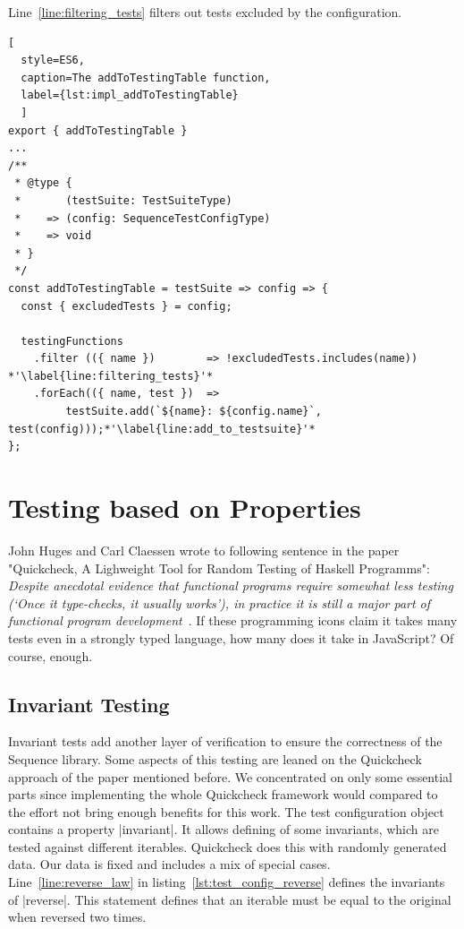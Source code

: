 Line~\ref{line:filtering_tests} filters out tests excluded by the
configuration. 
\begin{lstlisting}[
  style=ES6, 
  caption=The addToTestingTable function,
  label={lst:impl_addToTestingTable}
  ]
export { addToTestingTable }
...
/**
 * @type {
 *       (testSuite: TestSuiteType)
 *    => (config: SequenceTestConfigType)
 *    => void
 * }
 */
const addToTestingTable = testSuite => config => {
  const { excludedTests } = config;

  testingFunctions
    .filter (({ name })        => !excludedTests.includes(name)) *'\label{line:filtering_tests}'*
    .forEach(({ name, test })  => 
         testSuite.add(`${name}: ${config.name}`, test(config)));*'\label{line:add_to_testsuite}'*
};
\end{lstlisting}


\section{Testing based on Properties}
\label{sec:Testing based on Properties}
John Huges and Carl Claessen wrote to following sentence in the paper
"Quickcheck, A Lighweight Tool for Random Testing of Haskell Programms":
\textit{
Despite anecdotal evidence that functional programs require somewhat less
testing (`Once it type-checks, it usually works'), in practice it is still a 
major part of functional program development}~\cite{quickcheck_hughes}.
If these programming icons claim it takes many tests even in a strongly typed 
language, how many does it take in JavaScript? Of course, enough.

\subsection{Invariant Testing}
\label{sub:Invariant Testing}
Invariant tests add another layer of verification to ensure the correctness of
the Sequence library. Some aspects of this testing are leaned on the Quickcheck
approach of the paper mentioned before. We concentrated on only some essential
parts since implementing the whole Quickcheck framework would compared to the
effort not bring enough benefits for this work.
\newline
The test configuration object contains a property |invariant|. It allows
defining of some invariants, which are tested against different iterables.
Quickcheck does this with randomly generated data. Our data is fixed and
includes a mix of special cases.
\newline
Line~\ref{line:reverse_law} in listing~\ref{lst:test_config_reverse} defines
the invariants of |reverse|. This statement defines that an iterable must be 
equal to the original when reversed two times.

